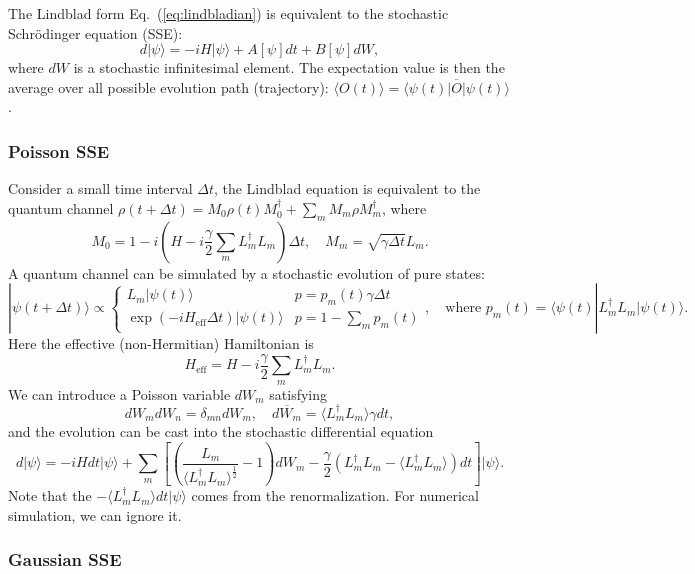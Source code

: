 \documentclass[aps,prx,superscriptaddress,nofootinbib]{revtex4}
\begin{document}
The Lindblad form Eq.~(\ref{eq:lindbladian}) is equivalent to the stochastic Schr\"{o}dinger equation (SSE):
\begin{equation}
	d|\psi\rangle = -iH|\psi\rangle + A[\psi]dt + B[\psi]dW,
\end{equation}
where $dW$ is a stochastic infinitesimal element. The expectation value is then the average over all possible evolution path (trajectory): $\langle O(t) \rangle = \overline{\langle\psi(t)|O|\psi(t)\rangle}$.
\subsubsection{Poisson SSE}
Consider a small time interval $\Delta t$, the Lindblad equation is equivalent to the quantum channel $\rho(t+\Delta t) = M_0 \rho(t) M_0^\dagger + \sum_m M_m \rho M_m^\dagger$, where
$$
	M_0 = 1 - i\left(H - i\frac{\gamma}{2} \sum_m L_m^\dagger L_m\right)\Delta t, \quad
	M_m = \sqrt{\gamma\Delta t} L_m.
$$
A quantum channel can be simulated by a stochastic evolution of pure states:
\begin{equation}
	|\psi(t+\Delta t)\rangle \propto \begin{cases}
		L_m |\psi(t)\rangle & p = p_m(t) \gamma\Delta t \\
		\exp(-iH_{\mathrm{eff}}\Delta t)|\psi(t)\rangle & p = 1-\sum_m p_m(t)
	\end{cases},\quad\text{where }p_m(t)= \langle\psi(t)|L_m^\dagger L_m|\psi(t)\rangle.
\end{equation}
Here the effective (non-Hermitian) Hamiltonian is
\begin{equation}
	H_{\mathrm{eff}} = H -i\frac{\gamma}{2}\sum_m L_m^\dagger L_m.
\end{equation}
We can introduce a Poisson variable $dW_m$ satisfying 
$$dW_m dW_n = \delta_{mn} dW_m,\quad \overline{dW_m} = \langle L_m^\dagger L_m\rangle\gamma dt,$$
and the evolution can be cast into the stochastic differential equation
\begin{equation}
	d|\psi\rangle = -iHdt |\psi\rangle + \sum_m \left[\left(\frac{L_m}{\langle L_m^\dagger L_m\rangle^{\frac{1}{2}}}-1\right)dW_m -\frac{\gamma}{2} \left(L_m^\dagger L_m-\langle L_m^\dagger L_m\rangle\right)dt \right]
	  |\psi\rangle.
\end{equation}
Note that the $-\langle L_m^\dagger L_m\rangle dt |\psi\rangle$ comes from the renormalization. For numerical simulation, we can ignore it.



\subsubsection{Gaussian SSE}
\end{document}
